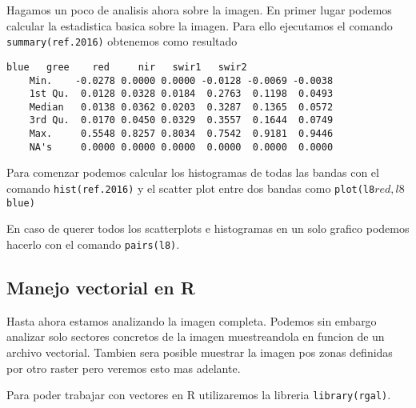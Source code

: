 \begin{exa}

    Hagamos un poco de analisis ahora sobre la imagen. En primer lugar podemos
    calcular la estadistica basica sobre la imagen. Para ello ejecutamos el
    comando \texttt{summary(ref.2016)}
    obtenemos como resultado
    \begin{Verbatim}[fontsize=\small]
               blue   gree    red     nir   swir1   swir2
    Min.    -0.0278 0.0000 0.0000 -0.0128 -0.0069 -0.0038
    1st Qu.  0.0128 0.0328 0.0184  0.2763  0.1198  0.0493
    Median   0.0138 0.0362 0.0203  0.3287  0.1365  0.0572
    3rd Qu.  0.0170 0.0450 0.0329  0.3557  0.1644  0.0749
    Max.     0.5548 0.8257 0.8034  0.7542  0.9181  0.9446
    NA's     0.0000 0.0000 0.0000  0.0000  0.0000  0.0000
    \end{Verbatim}
    Para comenzar podemos calcular los histogramas de todas las bandas con el
    comando \texttt{hist(ref.2016)} y el scatter plot entre dos bandas como
    \texttt{plot(l8$red, l8$blue)}

    En caso de querer todos los scatterplots e histogramas en un solo grafico
    podemos hacerlo con el comando \texttt{pairs(l8)}.
    \end{exa}


\subsection{Manejo vectorial en R}

Hasta ahora estamos analizando la imagen completa. Podemos sin embargo analizar
solo sectores concretos de la imagen muestreandola en funcion de un archivo
vectorial. Tambien sera posible muestrar la imagen pos zonas definidas por otro
raster pero veremos esto mas adelante.

Para poder trabajar con vectores en R utilizaremos la libreria
\texttt{library(rgal)}.

